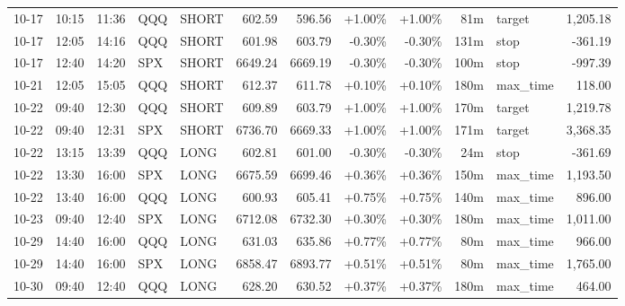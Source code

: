 \documentclass[11pt,a4paper,twoside]{article}
\begin{document}
\begin{center}
\begin{longtable}{>{\color{txtmain}}l l l l l r r r r r >{\color{txtmain}}l r}
10-17 & 10:15 & 11:36 & QQQ & SHORT & 602.59 & 596.56 & \textcolor{wingreen}{+1.00\%} & \textcolor{wingreen}{+1.00\%} & 81m & target & \textcolor{wingreen}{1,205.18} \\
10-17 & 12:05 & 14:16 & QQQ & SHORT & 601.98 & 603.79 & \textcolor{lossred}{-0.30\%} & \textcolor{lossred}{-0.30\%} & 131m & stop & \textcolor{lossred}{-361.19} \\
10-17 & 12:40 & 14:20 & SPX & SHORT & 6649.24 & 6669.19 & \textcolor{lossred}{-0.30\%} & \textcolor{lossred}{-0.30\%} & 100m & stop & \textcolor{lossred}{-997.39} \\
10-21 & 12:05 & 15:05 & QQQ & SHORT & 612.37 & 611.78 & \textcolor{wingreen}{+0.10\%} & \textcolor{wingreen}{+0.10\%} & 180m & max\_time & \textcolor{wingreen}{118.00} \\
10-22 & 09:40 & 12:30 & QQQ & SHORT & 609.89 & 603.79 & \textcolor{wingreen}{+1.00\%} & \textcolor{wingreen}{+1.00\%} & 170m & target & \textcolor{wingreen}{1,219.78} \\
10-22 & 09:40 & 12:31 & SPX & SHORT & 6736.70 & 6669.33 & \textcolor{wingreen}{+1.00\%} & \textcolor{wingreen}{+1.00\%} & 171m & target & \textcolor{wingreen}{3,368.35} \\
10-22 & 13:15 & 13:39 & QQQ & LONG & 602.81 & 601.00 & \textcolor{lossred}{-0.30\%} & \textcolor{lossred}{-0.30\%} & 24m & stop & \textcolor{lossred}{-361.69} \\
10-22 & 13:30 & 16:00 & SPX & LONG & 6675.59 & 6699.46 & \textcolor{wingreen}{+0.36\%} & \textcolor{wingreen}{+0.36\%} & 150m & max\_time & \textcolor{wingreen}{1,193.50} \\
10-22 & 13:40 & 16:00 & QQQ & LONG & 600.93 & 605.41 & \textcolor{wingreen}{+0.75\%} & \textcolor{wingreen}{+0.75\%} & 140m & max\_time & \textcolor{wingreen}{896.00} \\
10-23 & 09:40 & 12:40 & SPX & LONG & 6712.08 & 6732.30 & \textcolor{wingreen}{+0.30\%} & \textcolor{wingreen}{+0.30\%} & 180m & max\_time & \textcolor{wingreen}{1,011.00} \\
10-29 & 14:40 & 16:00 & QQQ & LONG & 631.03 & 635.86 & \textcolor{wingreen}{+0.77\%} & \textcolor{wingreen}{+0.77\%} & 80m & max\_time & \textcolor{wingreen}{966.00} \\
10-29 & 14:40 & 16:00 & SPX & LONG & 6858.47 & 6893.77 & \textcolor{wingreen}{+0.51\%} & \textcolor{wingreen}{+0.51\%} & 80m & max\_time & \textcolor{wingreen}{1,765.00} \\
10-30 & 09:40 & 12:40 & QQQ & LONG & 628.20 & 630.52 & \textcolor{wingreen}{+0.37\%} & \textcolor{wingreen}{+0.37\%} & 180m & max\_time & \textcolor{wingreen}{464.00} \\

\end{longtable}
\end{center}
\end{document}
